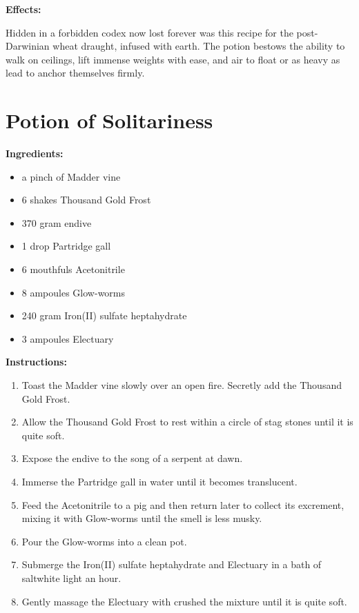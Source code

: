 \documentclass{article}
\begin{document}
\textbf{Effects:}

Hidden in a forbidden codex now lost forever was this recipe for the post-Darwinian wheat draught, infused with earth. The potion bestows the ability to walk on ceilings, lift immense weights with ease, and air to float or as heavy as lead to anchor themselves firmly.

\newpage
\section*{Potion of Solitariness}

\textbf{Ingredients:}

\begin{itemize}
  \item a pinch of Madder vine
  \item 6 shakes Thousand Gold Frost
  \item 370 gram endive
  \item 1 drop Partridge gall
  \item 6 mouthfuls Acetonitrile
  \item 8 ampoules Glow-worms
  \item 240 gram Iron(II) sulfate heptahydrate
  \item 3 ampoules Electuary
\end{itemize}

\textbf{Instructions:}

\begin{enumerate}
  \item Toast the Madder vine slowly over an open fire. Secretly add the Thousand Gold Frost.
  \item Allow the Thousand Gold Frost to rest within a circle of stag stones until it is quite soft.
  \item Expose the endive to the song of a serpent at dawn.
  \item Immerse the Partridge gall in water until it becomes translucent.
  \item Feed the Acetonitrile to a pig and then return later to collect its excrement, mixing it with Glow-worms until the smell is less musky.
  \item Pour the Glow-worms into a clean pot.
  \item Submerge the Iron(II) sulfate heptahydrate and Electuary in a bath of saltwhite light an hour.
  \item Gently massage the Electuary with crushed the mixture until it is quite soft.
\end{enumerate}
\end{document}
